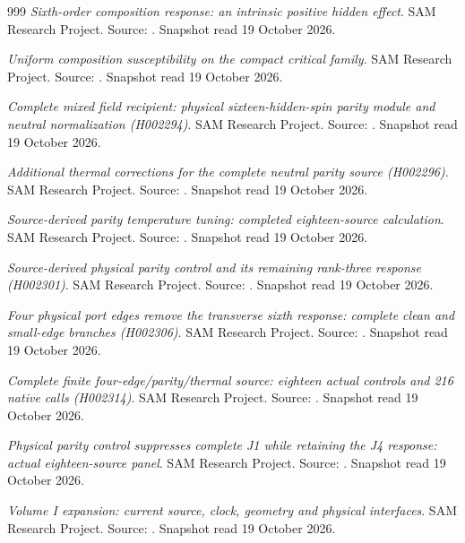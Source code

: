 \begin{thebibliography}{999}
 \emph{Sixth-order composition response: an intrinsic positive hidden effect}. SAM Research Project. Source: . Snapshot read 19 October 2026.

 \emph{Uniform composition susceptibility on the compact critical family}. SAM Research Project. Source: . Snapshot read 19 October 2026.

 \emph{Complete mixed field recipient: physical sixteen-hidden-spin parity module and neutral normalization (H002294)}. SAM Research Project. Source: . Snapshot read 19 October 2026.

 \emph{Additional thermal corrections for the complete neutral parity source (H002296)}. SAM Research Project. Source: . Snapshot read 19 October 2026.

 \emph{Source-derived parity temperature tuning: completed eighteen-source calculation}. SAM Research Project. Source: . Snapshot read 19 October 2026.

 \emph{Source-derived physical parity control and its remaining rank-three response (H002301)}. SAM Research Project. Source: . Snapshot read 19 October 2026.

 \emph{Four physical port edges remove the transverse sixth response: complete clean and small-edge branches (H002306)}. SAM Research Project. Source: . Snapshot read 19 October 2026.

 \emph{Complete finite four-edge/parity/thermal source: eighteen actual controls and 216 native calls (H002314)}. SAM Research Project. Source: . Snapshot read 19 October 2026.

 \emph{Physical parity control suppresses complete J1 while retaining the J4 response: actual eighteen-source panel}. SAM Research Project. Source: . Snapshot read 19 October 2026.

 \emph{Volume I expansion: current source, clock, geometry and physical interfaces}. SAM Research Project. Source: . Snapshot read 19 October 2026.


\end{thebibliography}
